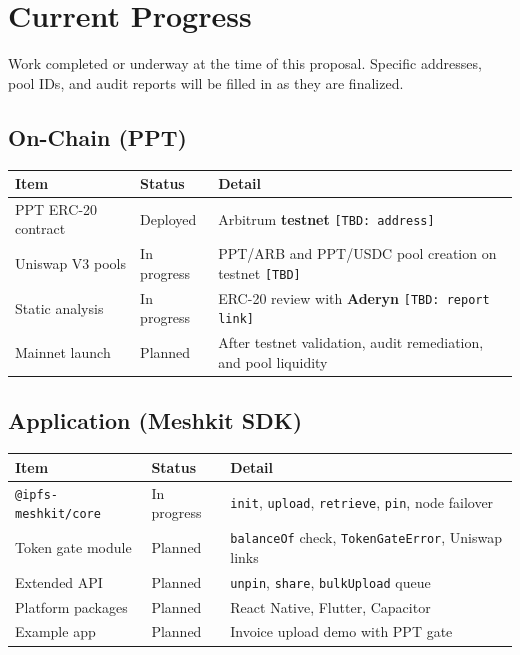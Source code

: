 \documentclass[11pt,a4paper,openany]{report}
\begin{document}
\chapter{Current Progress}

Work completed or underway at the time of this proposal. Specific addresses, pool IDs, and audit reports will be filled in as they are finalized.

\section{On-Chain (PPT)}

\begin{center}
\small
\begin{tabular}{@{}llp{7.2cm}@{}}
\toprule
\textbf{Item} & \textbf{Status} & \textbf{Detail} \\
\midrule
PPT ERC-20 contract & Deployed & Arbitrum \textbf{testnet} \texttt{[TBD: address]} \\
Uniswap V3 pools & In progress & PPT/ARB and PPT/USDC pool creation on testnet \texttt{[TBD]} \\
Static analysis & In progress & ERC-20 review with \textbf{Aderyn} \texttt{[TBD: report link]} \\
Mainnet launch & Planned & After testnet validation, audit remediation, and pool liquidity \\
\bottomrule
\end{tabular}
\end{center}

\section{Application (Meshkit SDK)}

\begin{center}
\small
\begin{tabular}{@{}llp{7.2cm}@{}}
\toprule
\textbf{Item} & \textbf{Status} & \textbf{Detail} \\
\midrule
\texttt{@ipfs-meshkit/core} & In progress & \texttt{init}, \texttt{upload}, \texttt{retrieve}, \texttt{pin}, node failover \\
Token gate module & Planned & \texttt{balanceOf} check, \texttt{TokenGateError}, Uniswap links \\
Extended API & Planned & \texttt{unpin}, \texttt{share}, \texttt{bulkUpload} queue \\
Platform packages & Planned & React Native, Flutter, Capacitor \\
Example app & Planned & Invoice upload demo with PPT gate \\
\bottomrule
\end{tabular}
\end{center}
\end{document}
